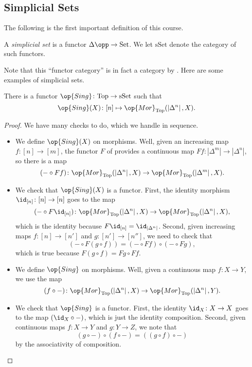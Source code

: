 \documentclass[../notes.tex]{subfiles}
\begin{document}
\subsection{Simplicial Sets}
The following is the first important definition of this course.
\begin{definition}
	A \textit{simplicial set} is a functor $\Delta\opp\to\mathrm{Set}$. We let $\mathrm{sSet}$ denote the category of such functors.
\end{definition}
Note that this ``functor category'' is in fact a category by . Here are some examples of simplicial sets.
\begin{example}[$\op{Sing}(X)$] \label{ex:sing-is-sset}
	There is a functor $\op{Sing}\colon\mathrm{Top}\to\mathrm{sSet}$ such that
	\[\op{Sing}(X)\colon[n]\mapsto\op{Mor}_{\mathrm{Top}}(\left|\Delta^n\right|,X).\]
\end{example}
\begin{proof}
	We have many checks to do, which we handle in sequence.
	\begin{itemize}
		\item We define $\op{Sing}(X)$ on morphisms. Well, given an increasing map $f\colon[n]\to[m]$, the functor $F$ of  provides a continuous map $Ff\colon\left|\Delta^m\right|\to\left|\Delta^n\right|$, so there is a map
		\[(-\circ Ff)\colon\op{Mor}_{\mathrm{Top}}(\left|\Delta^n\right|,X)\to\op{Mor}_{\mathrm{Top}}(\left|\Delta^m\right|,X).\]
		\item We check that $\op{Sing}(X)$ is a functor. First, the identity morphism $\id_{[n]}\colon[n]\to[n]$ goes to the map
		\[(-\circ F{\id_{[n]}})\colon\op{Mor}_{\mathrm{Top}}(\left|\Delta^n\right|,X)\to\op{Mor}_{\mathrm{Top}}(\left|\Delta^n\right|,X),\]
		which is the identity because $F{\id_{[n]}}=\id_{\left|\Delta^n\right|}$. Second, given increasing maps $f\colon[n]\to[n']$ and $g\colon[n']\to[n'']$, we need to check that
		\[(-\circ F(g\circ f))=(-\circ Ff)\circ(-\circ Fg),\]
		which is true because $F(g\circ f)=Fg\circ Ff$.
		\item We define $\op{Sing}$ on morphisms. Well, given a continuous map $f\colon X\to Y$, we use the map
		\[(f\circ-)\colon\op{Mor}_{\mathrm{Top}}(\left|\Delta^n\right|,X)\to\op{Mor}_{\mathrm{Top}}(\left|\Delta^n\right|,Y).\]
		\item We check that $\op{Sing}$ is a functor. First, the identity $\id_X\colon X\to X$ goes to the map $({\id_X}\circ-)$, which is just the identity composition. Second, given continuous maps $f\colon X\to Y$ and $g\colon Y\to Z$, we note that
		\[(g\circ-)\circ(f\circ-)=((g\circ f)\circ-)\]
		by the associativity of composition.
		\qedhere
	\end{itemize}
\end{proof}
\end{document}
